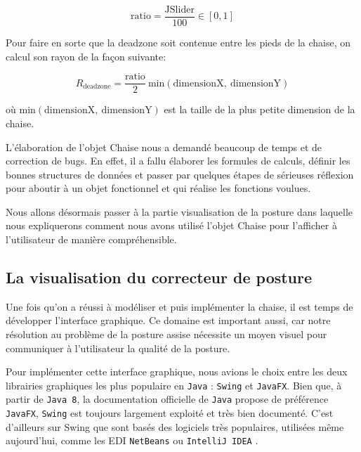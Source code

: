 \documentclass{polytech/polytech}
\begin{document}
$$\mathrm{ratio} = \frac{\mathrm{JSlider}}{100} \in [0, 1]$$

Pour faire en sorte que la deadzone soit contenue entre les pieds de la chaise, on calcul son rayon de la façon suivante:

$$R_\mathrm{deadzone} = \frac{\mathrm{ratio}}{2}\ \mathrm{min}(\mathrm{dimensionX},\ \mathrm{dimensionY})$$

où $\mathrm{min}(\mathrm{dimensionX},\ \mathrm{dimensionY})$ est la taille de la plus petite dimension de la chaise.

L'élaboration de l'objet Chaise nous a demandé beaucoup de temps et de correction de bugs. En effet, il a fallu élaborer les formules de calculs, définir les bonnes structures de données et passer par quelques étapes de sérieuses réflexion pour aboutir à un objet fonctionnel et qui réalise les fonctions voulues.

Nous allons désormais passer à la partie visualisation de la posture dans laquelle nous expliquerons comment nous avons utilisé l'objet Chaise pour l'afficher à l'utilisateur de manière compréhensible.


\subsection{La visualisation du correcteur de posture}
\label{subsec:visualisation}

Une fois qu'on a réussi à modéliser et puis implémenter la chaise, il est temps de développer l'interface graphique. Ce domaine est important aussi, car notre résolution au problème de la posture assise nécessite un moyen visuel pour communiquer à l'utilisateur la qualité de la posture.

Pour implémenter cette interface graphique, nous avions le choix entre les deux librairies graphiques les plus populaire en \texttt{Java} : \texttt{Swing} et \texttt{JavaFX}. Bien que, à partir de \texttt{Java 8}, la documentation officielle de \texttt{Java} propose de préférence \texttt{JavaFX}, \texttt{Swing} est toujours largement exploité et très bien documenté. C'est d'ailleurs sur Swing que sont basés des logiciels très populaires, utilisées même aujourd'hui, comme les EDI \texttt{NetBeans} ou \texttt{IntelliJ IDEA} .
\end{document}
